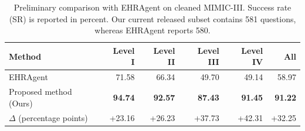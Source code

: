 \begin{table}[t]
\centering
\caption{Preliminary comparison with EHRAgent on cleaned MIMIC-III. Success rate (SR) is reported in percent. Our current released subset contains 581 questions, whereas EHRAgent reports 580.}
\label{tab:ehragent_comparison}
\begin{tabular}{lrrrrr}
\toprule
Method & Level I & Level II & Level III & Level IV & All \\
\midrule
EHRAgent & 71.58 & 66.34 & 49.70 & 49.14 & 58.97 \\
Proposed method (Ours) & \textbf{94.74} & \textbf{92.57} & \textbf{87.43} & \textbf{91.45} & \textbf{91.22} \\
\midrule
$\Delta$ (percentage points) & +23.16 & +26.23 & +37.73 & +42.31 & +32.25 \\
\bottomrule
\end{tabular}
\end{table}
